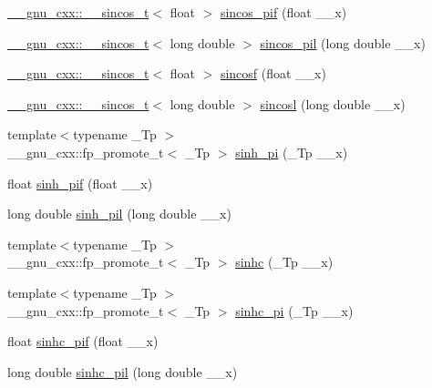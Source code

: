 \begin{DoxyCompactItemize}
\item 
\hyperlink{struct____gnu__cxx_1_1____sincos__t}{\+\_\+\+\_\+gnu\+\_\+cxx\+::\+\_\+\+\_\+sincos\+\_\+t}$<$ float $>$ \hyperlink{group__mathsf__gnu_gacf416c867a8a456f8f0e3d8b45ca8bd5}{sincos\+\_\+pif} (float \+\_\+\+\_\+x)
\item 
\hyperlink{struct____gnu__cxx_1_1____sincos__t}{\+\_\+\+\_\+gnu\+\_\+cxx\+::\+\_\+\+\_\+sincos\+\_\+t}$<$ long double $>$ \hyperlink{group__mathsf__gnu_ga1f1efc07313a3de1e994d89c3b83b957}{sincos\+\_\+pil} (long double \+\_\+\+\_\+x)
\item 
\hyperlink{struct____gnu__cxx_1_1____sincos__t}{\+\_\+\+\_\+gnu\+\_\+cxx\+::\+\_\+\+\_\+sincos\+\_\+t}$<$ float $>$ \hyperlink{group__mathsf__gnu_ga3929d13e38535418cd24db5cee80660c}{sincosf} (float \+\_\+\+\_\+x)
\item 
\hyperlink{struct____gnu__cxx_1_1____sincos__t}{\+\_\+\+\_\+gnu\+\_\+cxx\+::\+\_\+\+\_\+sincos\+\_\+t}$<$ long double $>$ \hyperlink{group__mathsf__gnu_ga96a7222e47d430a228973658ca9f6f35}{sincosl} (long double \+\_\+\+\_\+x)
\item 
{\footnotesize template$<$typename \+\_\+\+Tp $>$ }\\\+\_\+\+\_\+gnu\+\_\+cxx\+::fp\+\_\+promote\+\_\+t$<$ \+\_\+\+Tp $>$ \hyperlink{group__mathsf__gnu_gade43453b87b6b38c05b3fcce40870542}{sinh\+\_\+pi} (\+\_\+\+Tp \+\_\+\+\_\+x)
\item 
float \hyperlink{group__mathsf__gnu_ga74103f57ab0d97126732f3cb276c5ab3}{sinh\+\_\+pif} (float \+\_\+\+\_\+x)
\item 
long double \hyperlink{group__mathsf__gnu_ga2232ee554ef2a902824db42e2e09c483}{sinh\+\_\+pil} (long double \+\_\+\+\_\+x)
\item 
{\footnotesize template$<$typename \+\_\+\+Tp $>$ }\\\+\_\+\+\_\+gnu\+\_\+cxx\+::fp\+\_\+promote\+\_\+t$<$ \+\_\+\+Tp $>$ \hyperlink{group__mathsf__gnu_gaf2f02e4143e7beb97352cef4b7fcb663}{sinhc} (\+\_\+\+Tp \+\_\+\+\_\+x)
\item 
{\footnotesize template$<$typename \+\_\+\+Tp $>$ }\\\+\_\+\+\_\+gnu\+\_\+cxx\+::fp\+\_\+promote\+\_\+t$<$ \+\_\+\+Tp $>$ \hyperlink{group__mathsf__gnu_ga8bb6034e28d48879845bf64818cc06e1}{sinhc\+\_\+pi} (\+\_\+\+Tp \+\_\+\+\_\+x)
\item 
float \hyperlink{group__mathsf__gnu_ga26e54504db6541550266140f5264acbe}{sinhc\+\_\+pif} (float \+\_\+\+\_\+x)
\item 
long double \hyperlink{group__mathsf__gnu_gaa572bf7633f457c86cef65bfd6ec4ad9}{sinhc\+\_\+pil} (long double \+\_\+\+\_\+x)

\end{DoxyCompactItemize}
